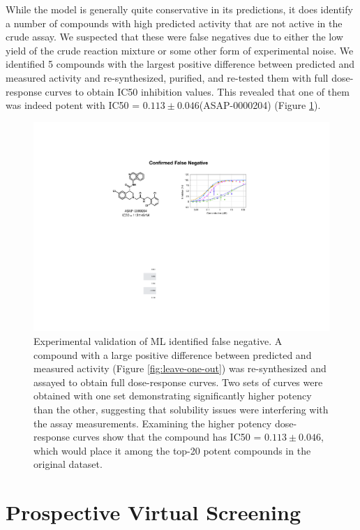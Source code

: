 While the model is generally quite conservative in its predictions, it does identify a number of compounds with high predicted activity that are not active in the crude assay. We suspected that these were false negatives due to either the low yield of the crude reaction mixture or some other form of experimental noise. We identified 5 compounds with the largest positive difference between predicted and measured activity and re-synthesized, purified, and re-tested them with full dose-response curves to obtain IC50 inhibition values. This revealed that one of them was indeed potent with IC50 = $0.113\pm0.046$\uM (ASAP-0000204) (Figure \ref{fig:false_negative}).


\begin{figure}
    \centering
    \includegraphics[width=\textwidth]{Chapters/Crude/Figs/false_negative.pdf}
    \caption{Experimental validation of ML identified false negative. A compound with a large positive difference between predicted and measured activity (Figure \ref{fig:leave-one-out}) was re-synthesized and assayed to obtain full dose-response curves. Two sets of curves were obtained with one set demonstrating significantly higher potency than the other, suggesting that solubility issues were interfering with the assay measurements. Examining the higher potency dose-response curves show that the compound has IC50 = $0.113\pm0.046$\uM, which would place it among the top-20 potent compounds in the original dataset.}
    \label{fig:false_negative}
\end{figure}

\section{Prospective Virtual Screening}

